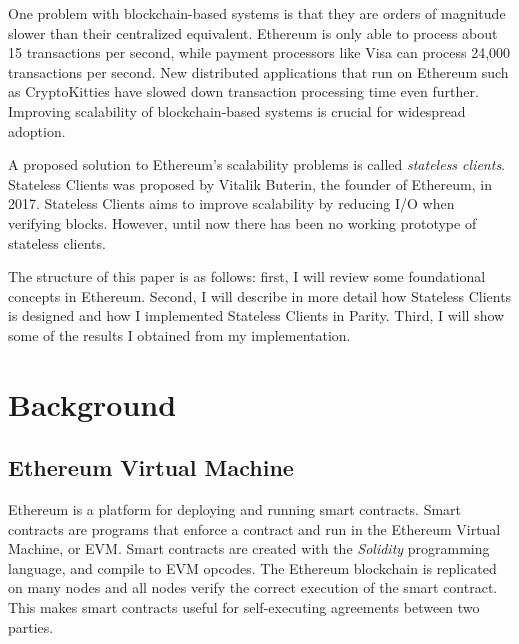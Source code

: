 \documentclass[12pt]{article}
\begin{document}
One problem with blockchain-based systems is that they are orders of magnitude slower than their centralized equivalent. Ethereum is only able to process about 15 transactions per second, while payment processors like Visa can process 24,000 transactions per second. New distributed applications that run on Ethereum such as CryptoKitties have slowed down transaction processing time even further. Improving scalability of blockchain-based systems is crucial for widespread adoption.

A proposed solution to Ethereum's scalability problems is called \emph{stateless clients}. Stateless Clients was proposed by Vitalik Buterin, the founder of Ethereum, in 2017. Stateless Clients aims to improve scalability by reducing I/O when verifying blocks. However, until now there has been no working prototype of stateless clients.

The structure of this paper is as follows: first, I will review some foundational concepts in Ethereum. Second, I will describe in more detail how Stateless Clients is designed and how I implemented Stateless Clients in Parity. Third, I will show some of the results I obtained from my implementation.

\section{Background}

\subsection{Ethereum Virtual Machine}

Ethereum is a platform for deploying and running smart contracts. Smart contracts are programs that enforce a contract and run in the Ethereum Virtual Machine, or EVM. Smart contracts are created with the \emph{Solidity} programming language, and compile to EVM opcodes. The Ethereum blockchain is replicated on many nodes and all nodes verify the correct execution of the smart contract. This makes smart contracts useful for self-executing agreements between two parties.
\end{document}
